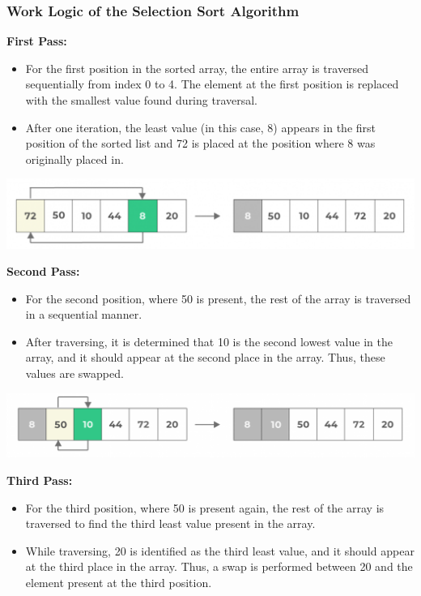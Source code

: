 \documentclass[a4paper,12pt,twocolumn]{article}
\begin{document}
\subsubsection*{Work Logic of the Selection Sort Algorithm}
\textbf{First Pass:}
\begin{itemize}
    \item For the first position in the sorted array, the entire array is traversed sequentially from index 0 to 4. The element at the first position is replaced with the smallest value found during traversal.
    \item After one iteration, the least value (in this case, 8) appears in the first position of the sorted list and 72 is placed at the position where 8 was originally placed in.
\end{itemize}
\begin{center}
    \includegraphics[width=0.9\linewidth]{pass-1.png}
    \label{pass-1}
\end{center}
\textbf{Second Pass:}
\begin{itemize}
    \item For the second position, where 50 is present, the rest of the array is traversed in a sequential manner.
    \item After traversing, it is determined that 10 is the second lowest value in the array, and it should appear at the second place in the array. Thus, these values are swapped.
\end{itemize}
\begin{center}
    \includegraphics[width=0.9\linewidth]{pass-2.png}
    \label{pass-2}
\end{center}
\textbf{Third Pass:}
\begin{itemize}
    \item For the third position, where 50 is present again, the rest of the array is traversed to find the third least value present in the array.
    \item While traversing, 20 is identified as the third least value, and it should appear at the third place in the array. Thus, a swap is performed between 20 and the element present at the third position.
\end{itemize}
\end{document}
